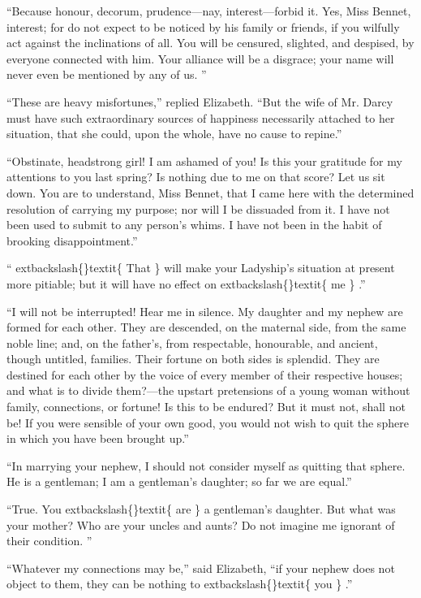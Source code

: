 \documentclass[10pt]{book}
\begin{document}
   “Because honour, decorum, prudence—nay, interest—forbid it. Yes, Miss
Bennet, interest; for do not expect to be noticed by his family or
friends, if you wilfully act against the inclinations of all. You will
be censured, slighted, and despised, by everyone connected with him.
Your alliance will be a disgrace; your name will never even be mentioned
by any of us.
   ”
  

   “These are heavy misfortunes,” replied Elizabeth. “But the wife of Mr.
Darcy must have such extraordinary sources of happiness necessarily
attached to her situation, that she could, upon the whole, have no cause
to repine.”
  

   “Obstinate, headstrong girl! I am ashamed of you! Is this your gratitude
for my attentions to you last spring? Is nothing due to me on that
score? Let us sit down. You are to understand, Miss Bennet, that I came
here with the determined resolution of carrying my purpose; nor will I
be dissuaded from it. I have not been used to submit to any person’s
whims. I have not been in the habit of brooking disappointment.”
  

   “
   	extbackslash\{\}textit\{
    That
   \}
   will make your Ladyship’s situation at present more pitiable;
but it will have no effect on
   	extbackslash\{\}textit\{
    me
   \}
   .”
  

   “I will not be interrupted! Hear me in silence. My daughter and my
nephew are formed for each other. They are descended, on the maternal
side, from the same noble line; and, on the father’s, from respectable,
honourable, and ancient, though untitled, families. Their fortune on
both sides is splendid. They are destined for each other by the voice of
every member of their respective houses; and what is to divide
them?—the upstart pretensions of a young woman without family,
connections, or fortune! Is this to be endured? But it must not, shall
not be! If you were sensible of your own good, you would not wish to
quit the sphere in which you have been brought up.”
  

   “In marrying your nephew, I should not consider myself as quitting that
sphere. He is a gentleman; I am a gentleman’s daughter; so far we are
equal.”
  

   “True. You
   	extbackslash\{\}textit\{
    are
   \}
   a gentleman’s daughter. But what was your mother? Who
are your uncles and aunts? Do not imagine me ignorant of their
condition.
   ”
  

   “Whatever my connections may be,” said Elizabeth, “if your nephew does
not object to them, they can be nothing to
   	extbackslash\{\}textit\{
    you
   \}
   .”
  
\end{document}
